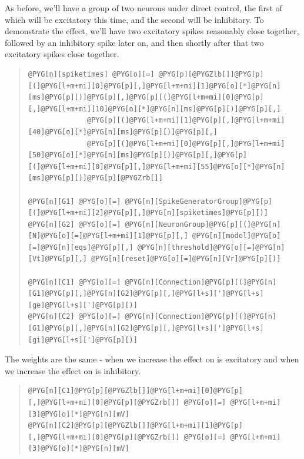 \documentclass[letterpaper,10pt,english]{manual}
\begin{document}
As before, we'll have a group of two neurons under direct control, the first
of which will be excitatory this time, and the second will be inhibitory. To
demonstrate the effect, we'll have two excitatory spikes reasonably close
together, followed by an inhibitory spike later on, and then shortly after
that two excitatory spikes close together.
\begin{quote}

\begin{Verbatim}[commandchars=@\[\]]
@PYG[n][spiketimes] @PYG[o][=] @PYG[p][@PYGZlb[]]@PYG[p][(]@PYG[l+m+mi][0]@PYG[p][,]@PYG[l+m+mi][1]@PYG[o][*]@PYG[n][ms]@PYG[p][)]@PYG[p][,]@PYG[p][(]@PYG[l+m+mi][0]@PYG[p][,]@PYG[l+m+mi][10]@PYG[o][*]@PYG[n][ms]@PYG[p][)]@PYG[p][,]
              @PYG[p][(]@PYG[l+m+mi][1]@PYG[p][,]@PYG[l+m+mi][40]@PYG[o][*]@PYG[n][ms]@PYG[p][)]@PYG[p][,]
              @PYG[p][(]@PYG[l+m+mi][0]@PYG[p][,]@PYG[l+m+mi][50]@PYG[o][*]@PYG[n][ms]@PYG[p][)]@PYG[p][,]@PYG[p][(]@PYG[l+m+mi][0]@PYG[p][,]@PYG[l+m+mi][55]@PYG[o][*]@PYG[n][ms]@PYG[p][)]@PYG[p][@PYGZrb[]]

@PYG[n][G1] @PYG[o][=] @PYG[n][SpikeGeneratorGroup]@PYG[p][(]@PYG[l+m+mi][2]@PYG[p][,]@PYG[n][spiketimes]@PYG[p][)]
@PYG[n][G2] @PYG[o][=] @PYG[n][NeuronGroup]@PYG[p][(]@PYG[n][N]@PYG[o][=]@PYG[l+m+mi][1]@PYG[p][,] @PYG[n][model]@PYG[o][=]@PYG[n][eqs]@PYG[p][,] @PYG[n][threshold]@PYG[o][=]@PYG[n][Vt]@PYG[p][,] @PYG[n][reset]@PYG[o][=]@PYG[n][Vr]@PYG[p][)]

@PYG[n][C1] @PYG[o][=] @PYG[n][Connection]@PYG[p][(]@PYG[n][G1]@PYG[p][,]@PYG[n][G2]@PYG[p][,]@PYG[l+s][']@PYG[l+s][ge]@PYG[l+s][']@PYG[p][)]
@PYG[n][C2] @PYG[o][=] @PYG[n][Connection]@PYG[p][(]@PYG[n][G1]@PYG[p][,]@PYG[n][G2]@PYG[p][,]@PYG[l+s][']@PYG[l+s][gi]@PYG[l+s][']@PYG[p][)]
\end{Verbatim}
\end{quote}

The weights are the same - when we increase  the effect on  is excitatory
and when we increase  the effect on  is inhibitory.
\begin{quote}

\begin{Verbatim}[commandchars=@\[\]]
@PYG[n][C1]@PYG[p][@PYGZlb[]]@PYG[l+m+mi][0]@PYG[p][,]@PYG[l+m+mi][0]@PYG[p][@PYGZrb[]] @PYG[o][=] @PYG[l+m+mi][3]@PYG[o][*]@PYG[n][mV]
@PYG[n][C2]@PYG[p][@PYGZlb[]]@PYG[l+m+mi][1]@PYG[p][,]@PYG[l+m+mi][0]@PYG[p][@PYGZrb[]] @PYG[o][=] @PYG[l+m+mi][3]@PYG[o][*]@PYG[n][mV]
\end{Verbatim}
\end{quote}
\end{document}
